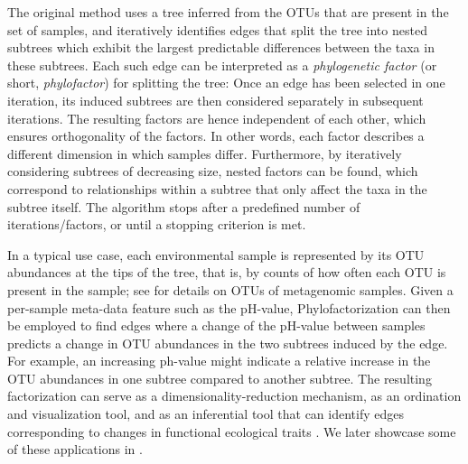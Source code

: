 The original method \cite{Washburne2017a} uses a tree inferred from the OTUs that are present in the set of samples,
and iteratively identifies edges that split the tree into nested subtrees
which exhibit the largest predictable differences between the taxa in these subtrees.
Each such edge can be interpreted as a \emph{phylogenetic factor} (or short, \emph{phylofactor}) for splitting the tree:
Once an edge has been selected in one iteration, its induced subtrees are then considered separately in subsequent iterations.
The resulting factors are hence independent of each other, which ensures orthogonality of the factors.
In other words, each factor describes a different dimension in which samples differ. %
Furthermore, by iteratively considering subtrees of decreasing size, nested factors can be found,
which correspond to relationships within a subtree that only affect the taxa in the subtree itself.
The algorithm stops after a predefined number of iterations/factors, %
or until a stopping criterion is met.

In a typical use case, each environmental sample is represented by its OTU abundances at the tips of the tree,
that is, by counts of how often each OTU is present in the sample; 
see  for details on OTUs of metagenomic samples.
Given a per-sample meta-data feature such as the pH-value,
Phylofactorization can then be employed to find edges where a change of the pH-value between samples
predicts a change in OTU abundances in the two subtrees induced by the edge.
For example, an increasing ph-value might indicate
a relative increase in the OTU abundances in one subtree compared to another subtree.
The resulting factorization can serve as a dimensionality-reduction mechanism, as an ordination and visualization tool,
and as an inferential tool that can identify edges corresponding to changes in functional ecological traits \cite{Washburne2017a}.
We later showcase some of these applications in .


